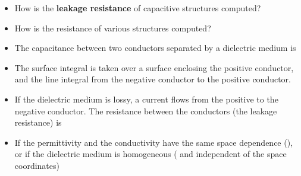 \ELhold


\begin{ELunit}


\begin{itemize}
\item
  How is the \textbf{leakage resistance} of capacitive structures computed?
\item
  How is the resistance of various structures computed?
\item
  The capacitance between two conductors separated by a dielectric medium is
\end{itemize}


\begin{itemize}
\tightlist
\item
  The surface integral is taken over a surface enclosing the positive conductor, and the line integral from the negative conductor to the positive conductor.
\item
  If the dielectric medium is lossy, a current flows from the positive to the negative conductor. The resistance between the conductors (the leakage resistance) is
\end{itemize}


\end{ELunit}

\begin{ELjoin}

\begin{itemize}
\tightlist
\item
  If the permittivity and the conductivity have the same space dependence (), or if the dielectric medium is homogeneous (\ELim{\epsilon} and \ELim{\sigma} independent of the space coordinates)
\end{itemize}

\begin{ELimportant}{}


\end{ELimportant}

\end{ELjoin}


